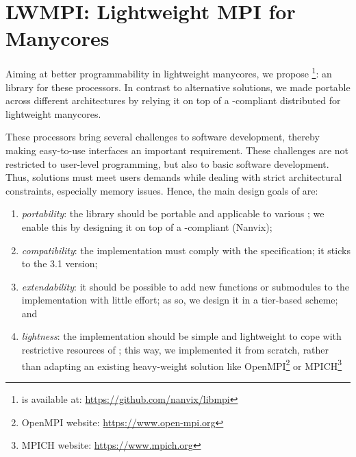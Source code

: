 \section{LWMPI: Lightweight MPI for Manycores}
\label{sec:proposal}

	Aiming at better programmability in lightweight manycores,
	we propose \lwmpi\footnote{\lwmpi is available at:
	\url{https://github.com/nanvix/libmpi}}: an \mpi library for these
	processors. In contrast to alternative solutions, we made \lwmpi portable
	across different architectures by relying it on top of a \posix-compliant
	distributed \os for lightweight manycores.

	These processors bring several challenges to software development, thereby
	making easy-to-use interfaces an important requirement.
	These challenges are not restricted to user-level
	programming, but also to basic software development. Thus, solutions
	must meet users demands while dealing with
	strict architectural constraints, especially memory issues.
	Hence, the main design goals of \lwmpi are:
	\begin{enumerate}[label=(\roman*)]
		\item \textit{portability}: the library should be portable and
			applicable to various \lws; we enable this by designing it
			on top of a \posix-compliant \os (Nanvix);

		\item \textit{compatibility}: the implementation
			must comply with the \mpi specification; it sticks to the
			3.1 version;

		\item \textit{extendability}: it should be possible to add new
			functions or submodules to the implementation with little
			effort; as so, we design it in a tier-based scheme; and

		\item \textit{lightness}: the implementation should be simple and
			lightweight to cope with restrictive resources of \lws; this way,
			we implemented it from scratch, rather than adapting an existing
			heavy-weight solution like
			OpenMPI\footnote{OpenMPI website: \url{https://www.open-mpi.org}} or
			MPICH\footnote{MPICH website: \url{https://www.mpich.org}}
	\end{enumerate}


